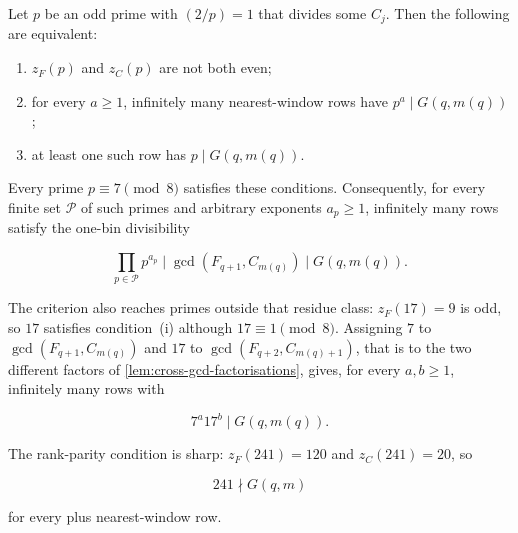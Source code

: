 \begin{theorem}
\label{thm:local-clocks}
Let $p$ be an odd prime with $(2/p)=1$ that divides some $C_j$. Then the
following are equivalent:

\begin{enumerate}[label=\textup{(\roman*)}]
 \item $z_F(p)$ and $z_C(p)$ are not both even;
 \item for every $a\geqslant1$, infinitely many nearest-window rows have
 $p^a\mid G(q,m(q))$;
 \item at least one such row has $p\mid G(q,m(q))$.
\end{enumerate}

Every prime $p\equiv7\pmod8$ satisfies these conditions. Consequently, for
every finite set $\mathcal P$ of such primes and arbitrary exponents
$a_p\geqslant1$, infinitely many rows satisfy the one-bin divisibility

\begin{equation}
 \prod_{p\in\mathcal P}p^{a_p}
 \mid\gcd(F_{q+1},C_{m(q)})
 \mid G(q,m(q)).
 \label{eq:seven-class-product}
\end{equation}

The criterion also reaches primes outside that residue class: $z_F(17)=9$ is
odd, so $17$ satisfies condition~(i) although $17\equiv1\pmod8$. Assigning
$7$ to $\gcd(F_{q+1},C_{m(q)})$ and $17$ to $\gcd(F_{q+2},C_{m(q)+1})$, that
is to the two different factors of
\cref{lem:cross-gcd-factorisations}, gives, for every $a,b\geqslant1$,
infinitely many rows with

\begin{equation}
 7^a17^b\mid G(q,m(q)).
 \label{eq:seven-seventeen}
\end{equation}

The rank-parity condition is sharp: $z_F(241)=120$ and $z_C(241)=20$, so

\begin{equation}
 241\nmid G(q,m)
 \label{eq:241-obstruction}
\end{equation}

for every plus nearest-window row.
\end{theorem}


